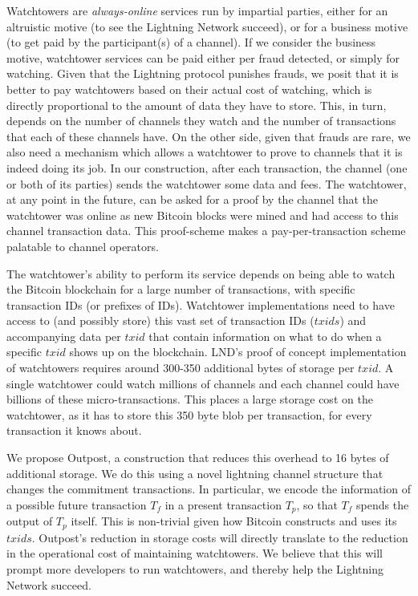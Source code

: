 Watchtowers are \textit{always-online} services run by impartial parties, either for an altruistic motive (to see the Lightning Network succeed), or for a business motive (to get paid by the participant(s) of a channel). If we consider the business motive, watchtower services can be paid either per fraud detected, or simply for watching. Given that the Lightning protocol punishes frauds, we posit that it is better to pay watchtowers based on their actual cost of watching, which is directly proportional to the amount of data they have to store. This, in turn, depends on the number of channels they watch and the number of transactions that each of these channels have. On the other side, given that frauds are rare, we also need a mechanism which allows a watchtower to prove to channels that it is indeed doing its job. In our construction, after each transaction, the channel (one or both of its parties) sends the watchtower some data and fees. The watchtower, at any point in the future, can be asked for a proof by the channel that the watchtower was online as new Bitcoin blocks were mined and had access to this channel transaction data. This proof-scheme makes a pay-per-transaction scheme palatable to channel operators.

The watchtower's ability to perform its service depends on being able to watch the Bitcoin blockchain for a large number of transactions, with specific transaction IDs (or prefixes of IDs). Watchtower implementations need to have access to (and possibly store) this vast set of transaction IDs ($\mathit{txids}$) and accompanying data per $\mathit{txid}$ that contain information on what to do when a specific $\mathit{txid}$ shows up on the blockchain. LND's proof of concept implementation of watchtowers \cite{lnd_watchtower} requires around 300-350 additional bytes of storage per $\mathit{txid}$. A single watchtower could watch millions of channels and each channel could have billions of these micro-transactions. This places a large storage cost on the watchtower, as it has to store this 350 byte blob per transaction, for every transaction it knows about. 

We propose Outpost, a construction that reduces this overhead to 16 bytes of additional storage. We do this using a novel lightning channel structure that changes the commitment transactions. In particular, we encode the information of a possible future transaction $T_f$ in a present transaction $T_p$, so that $T_f$ spends the output of $T_p$ itself. This is non-trivial given how Bitcoin constructs and uses its $\mathit{txids}$. Outpost's reduction in storage costs will directly translate to the reduction in the operational cost of maintaining watchtowers. We believe that this will prompt more developers to run watchtowers, and thereby help the Lightning Network succeed.

